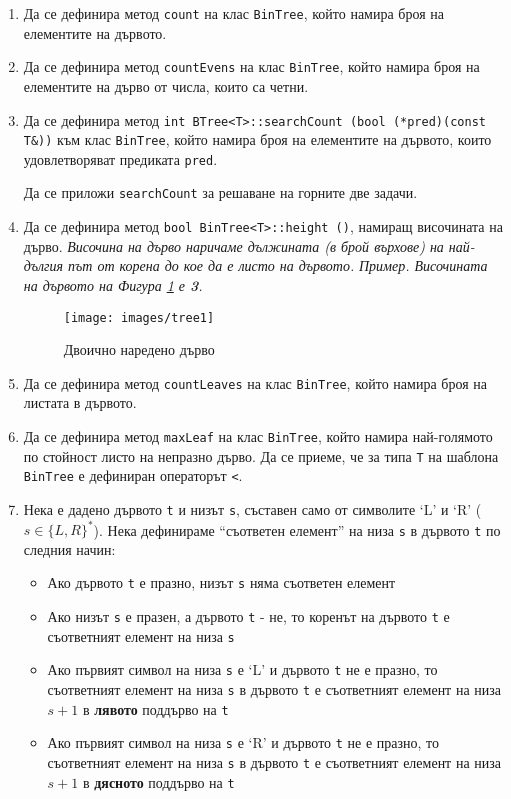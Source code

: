 \begin{enumerate}[]

	\item Да се дефинира метод \texttt{count} на клас \texttt{BinTree}, който намира броя на елементите на дървото.

	\item Да се дефинира метод \texttt{countEvens} на клас \texttt{BinTree}, който намира броя на елементите на дърво от числа, които са четни.


	\item Да се дефинира метод \texttt{int BTree<T>::searchCount (bool (*pred)(const T\&))} към клас \texttt{BinTree}, който намира броя на елементите на дървото, които удовлетворяват предиката \texttt{pred}.

	Да се приложи \texttt{searchCount} за решаване на горните две задачи.

	\item Да се дефинира метод \texttt{bool BinTree<T>::height ()}, намиращ височината на дърво. \textit{Височина на дърво наричаме дължината (в брой върхове) на най-дългия път от корена до кое да е листо на дървото.}
	\textit{Пример. Височината на дървото на Фигура \ref{fig:tree1} е \textbf{3}.}

  \begin{figure}
  \centering
	\texttt{[image: images/tree1]}

	\caption{Двоично наредено дърво}
  \label{fig:tree1}
  \end{figure}


	\item Да се дефинира метод \texttt{countLeaves} на клас \texttt{BinTree}, който намира броя на листата в дървото.

	\item Да се дефинира метод \texttt{maxLeaf} на клас \texttt{BinTree}, който намира най-голямото по стойност листо на непразно дърво. Да се приеме, че за типа \texttt{T} на шаблона \texttt{BinTree} е дефиниран операторът \texttt{<}.

	\item Нека е дадено дървото \texttt{t} и низът \texttt{s}, съставен само от символите `L' и `R' ($s \in \{L,R\}^*$). Нека дефинираме ``съответен елемент'' на низа \texttt{s} в дървото \texttt{t} по следния начин:
	\begin{itemize}
		\item Ако дървото \texttt{t} е празно, низът \texttt{s} няма съответен елемент
		\item Ако низът \texttt{s} е празен, а дървото \texttt{t} - не, то коренът на дървото \texttt{t} е съответният елемент на низа \texttt{s}
		\item Ако първият символ на низа \texttt{s} е `L' и дървото \texttt{t} не е празно, то съответният елемент на низа \texttt{s} в дървото \texttt{t} е съответният елемент на низа $s+1$ в \textbf{лявото} поддърво на \texttt{t}
		\item Ако първият символ на низа \texttt{s} е `R' и дървото \texttt{t} не е празно, то съответният елемент на низа \texttt{s} в дървото \texttt{t} е съответният елемент на низа $s+1$ в \textbf{дясното} поддърво на \texttt{t}
	\end{itemize}


\end{enumerate}
